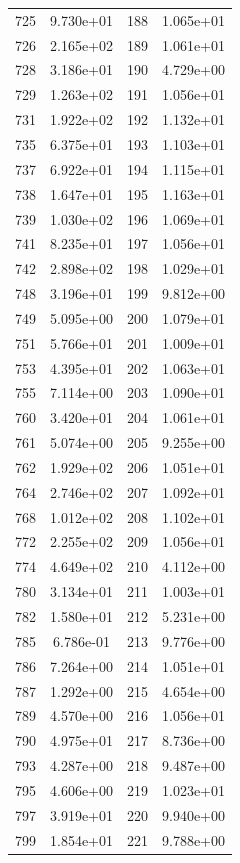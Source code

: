 \documentclass[12pt]{article}
\begin{document}
\begin{longtable}{@{}cccc@{}}
725 & 9.730e+01 & 188 & 1.065e+01 \\
726 & 2.165e+02 & 189 & 1.061e+01 \\
728 & 3.186e+01 & 190 & 4.729e+00 \\
729 & 1.263e+02 & 191 & 1.056e+01 \\
731 & 1.922e+02 & 192 & 1.132e+01 \\
735 & 6.375e+01 & 193 & 1.103e+01 \\
737 & 6.922e+01 & 194 & 1.115e+01 \\
738 & 1.647e+01 & 195 & 1.163e+01 \\
739 & 1.030e+02 & 196 & 1.069e+01 \\
741 & 8.235e+01 & 197 & 1.056e+01 \\
742 & 2.898e+02 & 198 & 1.029e+01 \\
748 & 3.196e+01 & 199 & 9.812e+00 \\
749 & 5.095e+00 & 200 & 1.079e+01 \\
751 & 5.766e+01 & 201 & 1.009e+01 \\
753 & 4.395e+01 & 202 & 1.063e+01 \\
755 & 7.114e+00 & 203 & 1.090e+01 \\
760 & 3.420e+01 & 204 & 1.061e+01 \\
761 & 5.074e+00 & 205 & 9.255e+00 \\
762 & 1.929e+02 & 206 & 1.051e+01 \\
764 & 2.746e+02 & 207 & 1.092e+01 \\
768 & 1.012e+02 & 208 & 1.102e+01 \\
772 & 2.255e+02 & 209 & 1.056e+01 \\
774 & 4.649e+02 & 210 & 4.112e+00 \\
780 & 3.134e+01 & 211 & 1.003e+01 \\
782 & 1.580e+01 & 212 & 5.231e+00 \\
785 & 6.786e-01 & 213 & 9.776e+00 \\
786 & 7.264e+00 & 214 & 1.051e+01 \\
787 & 1.292e+00 & 215 & 4.654e+00 \\
789 & 4.570e+00 & 216 & 1.056e+01 \\
790 & 4.975e+01 & 217 & 8.736e+00 \\
793 & 4.287e+00 & 218 & 9.487e+00 \\
795 & 4.606e+00 & 219 & 1.023e+01 \\
797 & 3.919e+01 & 220 & 9.940e+00 \\
799 & 1.854e+01 & 221 & 9.788e+00 \\

\end{longtable}
\end{document}
